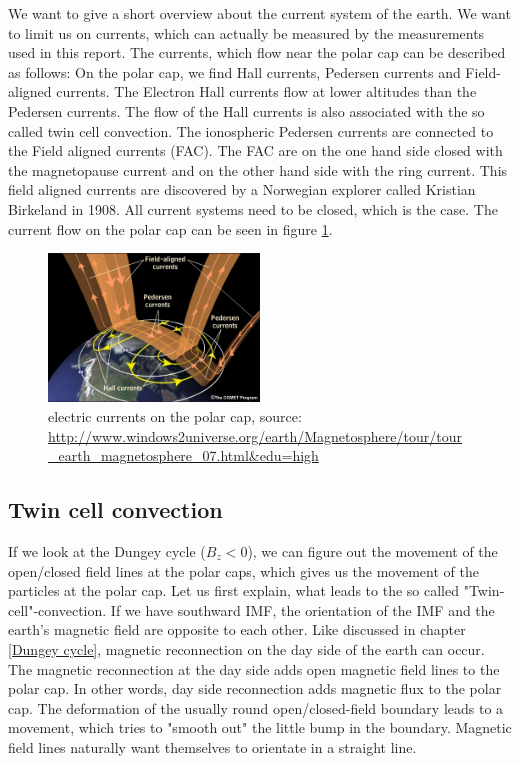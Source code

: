 \documentclass[10pt,a4paper]{article}
\begin{document}
We want to give a short overview about the current system of the earth. We want to limit us on currents, which can actually be measured by the measurements used in this report. 
The currents, which flow near the polar cap can be described as follows:
On the polar cap, we find Hall currents, Pedersen currents and Field-aligned currents. 
The Electron Hall currents flow at lower altitudes than the Pedersen currents. The flow of the Hall currents is also associated with the so called twin cell convection.
The ionospheric Pedersen currents are connected to the Field aligned currents (FAC). The FAC are on the one hand side closed with the magnetopause current and on the other hand side with the ring current.
This field aligned currents are discovered by a Norwegian explorer called Kristian Birkeland in 1908. All current systems need to be closed, which is the case. 
The current flow on the polar cap can be seen in figure \ref{electric currents on the polar cap}.

\begin{figure}[h]
\centering
\includegraphics[width=0.5\textwidth]{polar_electric_currents.jpg}
\caption{electric currents on the polar cap, source: \url{http://www.windows2universe.org/earth/Magnetosphere/tour/tour_earth_magnetosphere_07.html&edu=high}}
\label{electric currents on the polar cap}
\end{figure}

\subsection{Twin cell convection}
If we look at the Dungey cycle ($B_z<0$), we can figure out the movement of the open/closed field lines at the polar caps, which gives us the movement of the particles at the polar cap. 
Let us first explain, what leads to the so called "Twin-cell"-convection. If we have southward IMF, the orientation of the IMF and the earth's magnetic field are opposite to each other. Like discussed in chapter \ref{Dungey cycle}, magnetic reconnection on the day side of the earth can occur. The magnetic reconnection at the day side adds open magnetic field lines to the polar cap. In other words, day side reconnection adds magnetic flux to the polar cap. 
The deformation of the usually round open/closed-field boundary leads to a movement, which tries to "smooth out" the little bump in the boundary. Magnetic field lines naturally want themselves to orientate in a straight line. 
\end{document}
